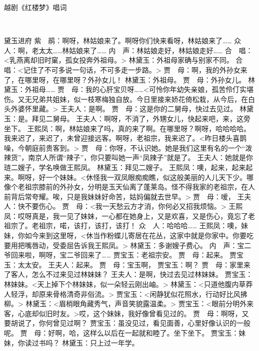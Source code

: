 \documentclass{article}
\begin{document}
\begin{center}\heiti\LARGE 越剧《红楼梦》唱词\end{center}
\kaiti\large

\ 

\setlength\LTleft\parindent

黛玉进府
紫　鹃：啊呀，林姑娘来了。啊呀你们快来看呀，林姑娘来了……
众　人：啊，老太太……林姑娘来了……
内　声：林姑娘走好，林姑娘走好……
合　唱：<乳燕离却旧时窠，孤女投奔外祖母。>
林黛玉：外祖母家确与别家不同。
合　唱：<记住了不可多说一句话，不可多走一步路。>
贾　母：啊，我的外孙女来了，在哪里呀，在哪里呀？外孙女儿！
林黛玉：外祖母。
贾　母：外孙女儿。
林黛玉：外祖母……
贾　母：我的心肝宝贝呀……<可怜你年幼失亲娘，孤苦伶仃实堪伤。又无兄弟共姐妹，似一枝寒梅独自放。今日里接来娇花倚松栽，从今后，在白头外婆怀里藏。>
王夫人：是啊。
贾　母：这是你的二舅母，快过去见过。
林黛玉：是。拜见二舅母。
王夫人：啊呀，不消了，外甥女儿，快起来吧，来，这旁坐下。
王熙凤：啊，林姑娘来了吗，真的来了啊。在哪里呀？啊呀，哈哈哈哈。我来迟了，来迟了，未曾迎接远客。啊呀，老祖宗，我来迟了。<昨日楼头喜鹊噪，今朝庭前贵客到。>
贾　母：你呀，不认识她。她是我们这里有名的一个“泼辣货”，南京人所谓“辣子”，你只要叫她一声“凤辣子”就是了。
王夫人：她就是你琏二嫂子，学名唤做王熙凤。
林黛玉：拜见二嫂子。
王熙凤：噢，起来，起来起来。啊呀，好一个妹妹。<休怪我一双凤眼痴痴瞧，似这般美丽的人儿天下少。哪像个老祖宗膝前的外孙女，分明是玉天仙离了蓬莱岛。怪不得我家的老祖宗，在人前背后常夸耀。唉，只是我妹妹好命苦，姑妈偏就去世早。>
贾　母：嗳，
王夫人：快不要伤心。
贾　母：<我一天愁云方才消，你何必又招我烦恼。>
王熙凤：哎呀真是，我一见了妹妹，一心都在她身上，又是欢喜，又是伤心，竟忘了老祖宗了。老祖宗，喏，该打，该打，该打！
众　人：哈哈哈……
王熙凤：噢，妹妹，你如今来到这里呀，<休当作粉蝶儿寄居在花丛，这家中就是你家中。你要吃要用把嘴唇动，受委屈告诉我王熙凤。>
林黛玉：多谢嫂子费心。
内　声：宝二爷回来啦，啊呀，宝二爷回来了……
贾宝玉：老祖宗安。
贾　母：起来。
贾宝玉：太太安。
王夫人：起来。
贾　母：宝玉啊，
贾宝玉：啊？
贾　母：家里来了客人，怎么不过来见过林妹妹？
王夫人：是啊，快过去见过林妹妹。
贾宝玉：林妹妹。<天上掉下个林妹妹，似一朵轻云刚出岫。>
林黛玉：<只道他腹内草莽人轻浮，却原来骨格清奇非俗流。>
贾宝玉：<闲静犹似花照水，行动好比风拂柳。>
林黛玉：<眉梢眼角藏秀气，声音笑貌露温柔。>
贾宝玉：<眼前分明外来客，心底却似旧时友。>哎，这个妹妹，我好像曾看见过的。
贾　母：啊呀，又要胡说了，你何曾见过啊？
贾宝玉：虽没见过，看见面善，心里好像认识的一般呢。
贾　母：好啊，哈，这样么以后在一起就和睦了。坐下坐下。
贾宝玉：妹妹，你读过书吗？
林黛玉：只上过一年学。
\end{document}
